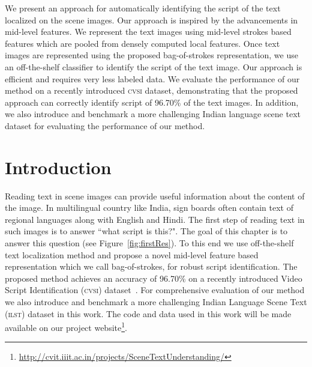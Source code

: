 We present an approach for automatically identifying the script of the text localized
on the scene images. Our approach is inspired by the advancements in mid-level features.
We represent the text images using mid-level strokes based features which are pooled from
densely computed local features. Once text images are represented using the proposed bag-of-strokes representation, we use an off-the-shelf classifier to identify the script of the text image. Our approach is efficient and requires very less labeled data. We evaluate the performance of our method on a recently introduced \textsc{cvsi} dataset, demonstrating that the proposed approach can correctly identify script of 96.70\% of the text images. In addition, we also introduce and benchmark a more challenging Indian language scene text dataset for evaluating the performance of
our method.
\section{Introduction}
Reading text in scene images can provide useful information about the content
of the image. In multilingual country like India, sign boards often contain text of regional languages along with English and Hindi. The first step of reading text in such images is to answer ``what script is this?". The goal of this chapter is to answer this question (see Figure~\ref{fig:firstRes}). To this end we use off-the-shelf text localization method and propose a novel mid-level feature based representation which we call bag-of-strokes, for robust script identification. The proposed method achieves an accuracy of 96.70\% on a recently introduced Video Script Identification (\textsc{cvsi}) dataset~\cite{CVSIComp}. For comprehensive evaluation of our method we also introduce and benchmark a more challenging 
Indian Language Scene Text (\textsc{ilst}) dataset in this work. The code and data used in this work will be made available on our project website\footnote{\url{http://cvit.iiit.ac.in/projects/SceneTextUnderstanding/}}.
 
